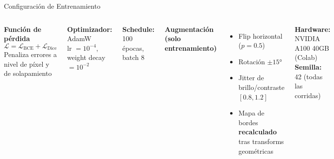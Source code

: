 \documentclass[aspectratio=169]{beamer}
\begin{document}
\begin{frame}{Configuración de Entrenamiento}
\begin{columns}
\textbf{Función de pérdida}
\begin{equation*}
\mathcal{L} = \mathcal{L}_\text{BCE} + \mathcal{L}_\text{Dice}
\end{equation*}
Penaliza errores a nivel de píxel y de solapamiento

\vspace{0.4em}
\textbf{Optimizador:} AdamW\\
lr $= 10^{-4}$, weight decay $= 10^{-2}$

\vspace{0.4em}
\textbf{Schedule:} 100 épocas, batch 8

\textbf{Augmentación (solo entrenamiento)}
\begin{itemize}
    \item Flip horizontal ($p = 0.5$)
    \item Rotación $\pm 15°$
    \item Jitter de brillo/contraste $[0.8, 1.2]$
    \item Mapa de bordes \textbf{recalculado} tras transforms geométricas
\end{itemize}

\vspace{0.3em}
\textbf{Hardware:} NVIDIA A100 40GB (Colab)\\
\textbf{Semilla:} 42 (todas las corridas)
\end{columns}
\end{frame}

\end{document}
